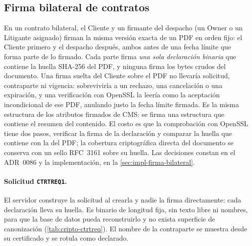 \subsection{Firma bilateral de contratos}\label{sec:diseno-firma-bilateral}

En un contrato bilateral, el Cliente y un firmante del despacho (un Owner o un
Litigante asignado) firman la misma versión exacta de un PDF en orden fijo: el
Cliente primero y el despacho después, ambos antes de una fecha límite que
forma parte de lo firmado. Cada parte firma \emph{una sola declaración
binaria} que contiene la huella SHA-256 del PDF, y ninguna firma los bytes
crudos del documento. Una firma suelta del Cliente sobre el PDF no llevaría
solicitud, contraparte ni vigencia: sobreviviría a un rechazo, una cancelación
o una expiración, y una verificación con OpenSSL la leería como la aceptación
incondicional de ese PDF, anulando justo la fecha límite firmada. Es la misma
estructura de los atributos firmados de CMS: se firma una estructura que
contiene el resumen del contenido. El costo es que la comprobación con OpenSSL
tiene dos pasos, verificar la firma de la declaración y comparar la huella que
contiene con la del PDF; la cobertura criptográfica directa del documento se
conserva con un sello RFC~3161 sobre su huella. Las decisiones constan en el
ADR~0086 y la implementación, en la \cref{sec:impl-firma-bilateral}.

\paragraph{Solicitud \texttt{CTRTREQ1}.} El servidor construye la solicitud al
crearla y nadie la firma directamente: cada declaración lleva su huella. Es
binario de longitud fija, sin texto libre ni nombres, para que la base de
datos pueda reconstruirlo y no exista superficie de canonización
(\cref{tab:cripto-ctrtreq}). El nombre de la contraparte se muestra desde su
certificado y se rotula como declarado.

